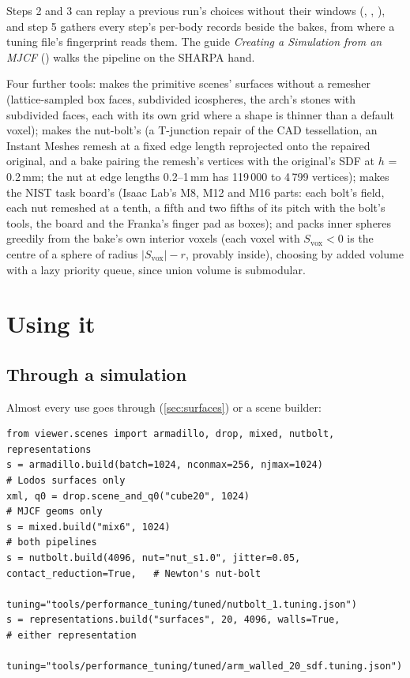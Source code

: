 Steps 2 and 3 can replay a previous run's choices without their windows (, , ), and step 5 gathers every step's per-body records beside the bakes, from where a tuning file's fingerprint reads them. The guide \emph{Creating a Simulation from an MJCF} () walks the pipeline on the SHARPA hand.

Four further tools:  makes the primitive scenes' surfaces without a remesher (lattice-sampled box faces, subdivided icospheres, the arch's stones with subdivided faces, each with its own grid where a shape is thinner than a default voxel);  makes the nut-bolt's (a T-junction repair of the CAD tessellation, an Instant Meshes remesh at a fixed edge length reprojected onto the repaired original, and a bake pairing the remesh's vertices with the original's SDF at $h$ = 0.2\,mm; the nut at edge lengths 0.2--1\,mm has 119\,000 to 4\,799 vertices);  makes the NIST task board's (Isaac Lab's M8, M12 and M16 parts: each bolt's field, each nut remeshed at a tenth, a fifth and two fifths of its pitch with the bolt's tools, the board and the Franka's finger pad as boxes); and  packs inner spheres greedily from the bake's own interior voxels (each voxel with $S_{\mathrm{vox}} < 0$ is the centre of a sphere of radius $\lvert S_{\mathrm{vox}}\rvert - r$, provably inside), choosing by added volume with a lazy priority queue, since union volume is submodular.

\section{Using it}\label{sec:using}

\subsection{Through a simulation}\label{sec:usesim}

Almost every use goes through  (\cref{sec:surfaces}) or a scene builder:

\begin{lstlisting}
from viewer.scenes import armadillo, drop, mixed, nutbolt, representations
s = armadillo.build(batch=1024, nconmax=256, njmax=1024)                # Lodos surfaces only
xml, q0 = drop.scene_and_q0("cube20", 1024)                             # MJCF geoms only
s = mixed.build("mix6", 1024)                                           # both pipelines
s = nutbolt.build(4096, nut="nut_s1.0", jitter=0.05, contact_reduction=True,   # Newton's nut-bolt
                  tuning="tools/performance_tuning/tuned/nutbolt_1.tuning.json")
s = representations.build("surfaces", 20, 4096, walls=True,             # either representation
                          tuning="tools/performance_tuning/tuned/arm_walled_20_sdf.tuning.json")
\end{lstlisting}

